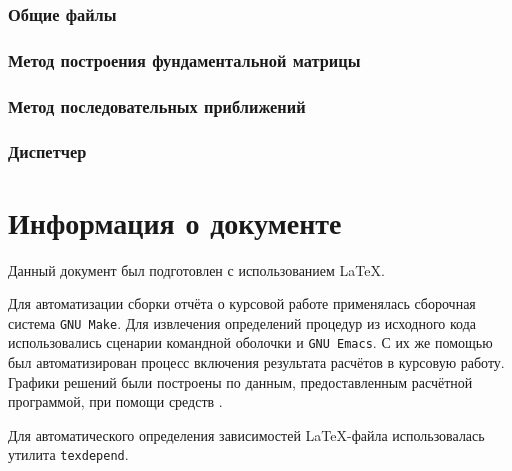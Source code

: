 \documentclass{article}
\numberwithin{equation}{section}
\begin{document}
\section{Общие файлы}




\newpage
\section{Метод построения  фундаментальной матрицы}



\newpage
\section{Метод последовательных приближений}



\newpage
\section{Диспетчер}



\newpage
\part{Информация о документе}

Данный документ был подготовлен с использованием \LaTeX{}.

Для автоматизации сборки отчёта о курсовой работе применялась
сборочная система \texttt{GNU Make}. Для извлечения определений
процедур из исходного кода использовались сценарии командной оболочки
и \texttt{GNU Emacs}. С их же помощью был автоматизирован процесс
включения результата расчётов в курсовую работу. Графики решений были
построены по данным, предоставленным расчётной программой, при помощи
средств \MP.

Для автоматического определения зависимостей
\LaTeX{}-файла использовалась утилита \texttt{texdepend}.
\end{document}

